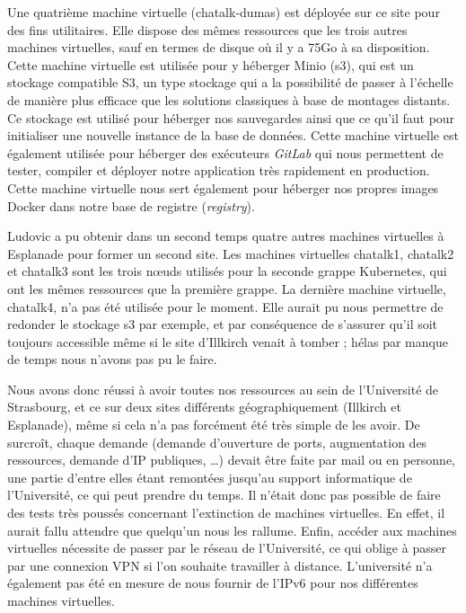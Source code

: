 Une quatrième machine virtuelle (chatalk-dumas) est déployée sur ce site
pour des fins utilitaires. Elle dispose des mêmes ressources que les
trois autres machines virtuelles, sauf en termes de disque où il y a
75Go à sa disposition. Cette machine virtuelle est utilisée pour y
héberger Minio (s3), qui est un stockage compatible S3, un type stockage
qui a la possibilité de passer à l'échelle de manière plus efficace que
les solutions classiques à base de montages distants. Ce stockage est
utilisé pour héberger nos sauvegardes ainsi que ce qu'il faut pour
initialiser une nouvelle instance de la base de données. Cette machine
virtuelle est également utilisée pour héberger des exécuteurs
\textit{GitLab} qui nous permettent de tester, compiler et déployer notre
application très rapidement en production. Cette machine virtuelle nous
sert également pour héberger nos propres images Docker dans notre base
de registre (\textit{registry}).

Ludovic a pu obtenir dans un second temps quatre autres machines
virtuelles à Esplanade pour former un second site. Les machines
virtuelles chatalk1, chatalk2 et chatalk3 sont les trois nœuds utilisés
pour la seconde grappe Kubernetes, qui ont les mêmes ressources que la
première grappe. La dernière machine virtuelle, chatalk4, n'a pas été
utilisée pour le moment. Elle aurait pu nous permettre de redonder le
stockage s3 par exemple, et par conséquence de s'assurer qu'il soit
toujours accessible même si le site d'Illkirch venait à tomber ; hélas
par manque de temps nous n'avons pas pu le faire.

Nous avons donc réussi à avoir toutes nos ressources au sein de
l'Université de Strasbourg, et ce sur deux sites différents
géographiquement (Illkirch et Esplanade), même si cela n'a pas forcément
été très simple de les avoir. De surcroît, chaque demande (demande
d'ouverture de ports, augmentation des ressources, demande d'IP
publiques, \ldots) devait être faite par mail ou en personne, une partie
d'entre elles étant remontées jusqu'au support informatique de
l'Université, ce qui peut prendre du temps. Il n'était donc pas possible
de faire des tests très poussés concernant l'extinction de machines
virtuelles. En effet, il aurait fallu attendre que quelqu'un nous les
rallume. Enfin, accéder aux machines virtuelles nécessite de passer par
le réseau de l'Université, ce qui oblige à passer par une connexion VPN
si l'on souhaite travailler à distance. L'université n'a également pas
été en mesure de nous fournir de l'IPv6 pour nos différentes machines
virtuelles.

